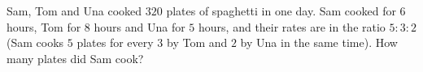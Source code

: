 Sam, Tom and Una cooked $320$ plates of spaghetti in one day. Sam cooked for $6$ hours, Tom for $8$ hours and Una for $5$ hours, and their rates are in the ratio $5:3:2$ (Sam cooks $5$ plates for every $3$ by Tom and $2$ by Una in the same time). How many plates did Sam cook?
